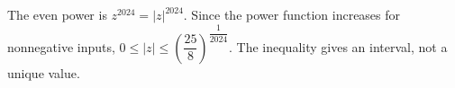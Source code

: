 The even power is $z^{2024}=|z|^{2024}$. Since the power function increases for nonnegative inputs, $\boxed{0\le |z|\le(\dfrac{25}{8})^{\dfrac{1}{2024}}}$. The inequality gives an interval, not a unique value.
